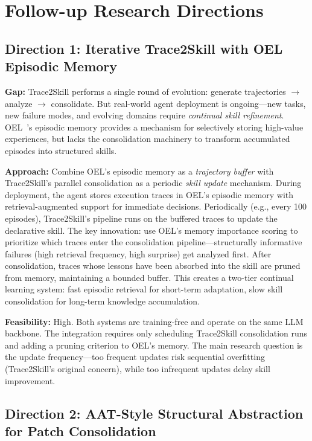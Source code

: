 \documentclass[11pt]{article}
\begin{document}
\section{Follow-up Research Directions}

\subsection{Direction 1: Iterative Trace2Skill with OEL Episodic Memory}

\textbf{Gap:} Trace2Skill performs a single round of evolution: generate trajectories $\to$ analyze $\to$ consolidate. But real-world agent deployment is ongoing---new tasks, new failure modes, and evolving domains require \textit{continual skill refinement}. OEL~\cite{oel}'s episodic memory provides a mechanism for selectively storing high-value experiences, but lacks the consolidation machinery to transform accumulated episodes into structured skills.

\textbf{Approach:} Combine OEL's episodic memory as a \textit{trajectory buffer} with Trace2Skill's parallel consolidation as a periodic \textit{skill update} mechanism. During deployment, the agent stores execution traces in OEL's episodic memory with retrieval-augmented support for immediate decisions. Periodically (e.g., every 100 episodes), Trace2Skill's pipeline runs on the buffered traces to update the declarative skill. The key innovation: use OEL's memory importance scoring to prioritize which traces enter the consolidation pipeline---structurally informative failures (high retrieval frequency, high surprise) get analyzed first. After consolidation, traces whose lessons have been absorbed into the skill are pruned from memory, maintaining a bounded buffer. This creates a two-tier continual learning system: fast episodic retrieval for short-term adaptation, slow skill consolidation for long-term knowledge accumulation.

\textbf{Feasibility:} High. Both systems are training-free and operate on the same LLM backbone. The integration requires only scheduling Trace2Skill consolidation runs and adding a pruning criterion to OEL's memory. The main research question is the update frequency---too frequent updates risk sequential overfitting (Trace2Skill's original concern), while too infrequent updates delay skill improvement.

\subsection{Direction 2: AAT-Style Structural Abstraction for Patch Consolidation}
\end{document}
